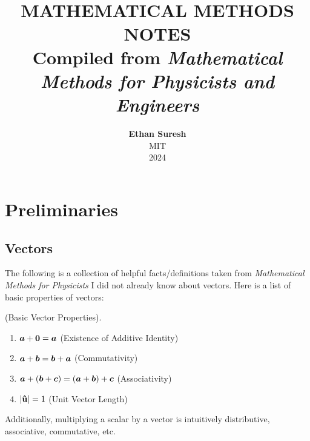 \documentclass[openany,oneside]{book}
\begin{document}

\title{ \normalsize \textsc{}
		\\ [2.0cm]
		\HRule{1.5pt} \\
		\LARGE \textbf{\uppercase{  Mathematical Methods Notes}
		\HRule{2.0pt} \\ [0.6cm] \LARGE{Compiled from \textit{Mathematical Methods for Physicists and Engineers}} \vspace*{10\baselineskip}}
		}
\date{}
\author{\textbf{Ethan Suresh} \\ 
		MIT \\
		2024}

\maketitle
\newpage

\tableofcontents
\newpage


\chapter{Preliminaries}

\section{Vectors}
The following is a collection of helpful facts/definitions taken from \textit{Mathematical Methods for Physicists} I did not already know about vectors. Here is a list of basic properties of vectors: 

\begin{theorem}

(Basic Vector Properties). 

\begin{enumerate}
  \item $\lvect{a} + \vect{0} = \lvect{a}$ (Existence of Additive Identity)
  \item $\bm{a} + \bm{b} = \bm{b} + \bm{a} $ (Commutativity) 
  \item $\bm{a} + (\bm{b} + \bm{c}) = (\bm{a} + \bm{b}) + \bm{c}$ (Associativity)
  \item $|\boldsymbol{\hat{\textbf{u}}} | = 1 $ (Unit Vector Length)
  
\end{enumerate}

Additionally, multiplying a scalar by a vector is intuitively distributive, associative, commutative, etc.
    
\end{theorem}
\end{document}
